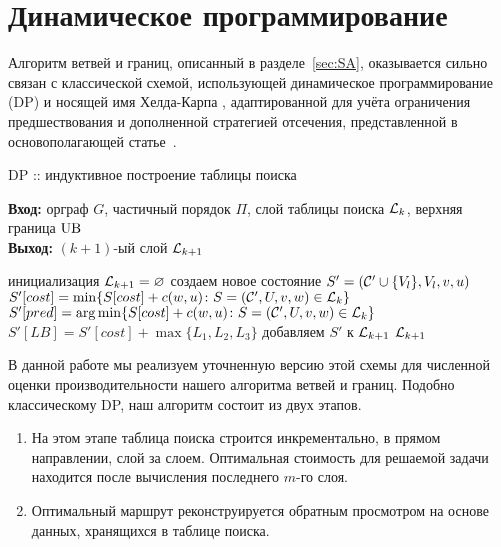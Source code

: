 \section{Динамическое программирование}\label{sec:DP}
Алгоритм ветвей и границ,
описанный в разделе~\ref{sec:SA},
оказывается сильно связан с классической схемой,
использующей динамическое программирование (DP)
и носящей имя Хелда-Карпа
\cite{HeldKarp1962},
адаптированной для учёта ограничения предшествования
и дополненной стратегией отсечения,
представленной в основополагающей статье~\cite{MorinMarsten1976}.

\begin{algorithm}[t]
\caption{DP ::  индуктивное построение таблицы поиска}\label{alg:A2}
\hspace*{\algorithmicindent}\textbf{Вход:} орграф $G$, частичный порядок $\Pi$, слой таблицы поиска $\mathcal{L}_k$, верхняя граница $\mathrm{UB}$\\
\hspace*{\algorithmicindent}\textbf{Выход:} $(k+1)$-ый слой $\mathcal{L}_{k+1}$
\begin{algorithmic}[1]
\STATE инициализация $\mathcal{L}_{k+1}=\varnothing$
      \STATE создаем новое состояние $S'=(\mathcal{C}'\cup\{V_l\}, V_l, v, u)$
      \STATE $S'[cost] = \min\{S[cost] + c(w,u)\colon S=(\mathcal{C}',U,v,w)\in\mathcal{L}_k\}$
      \STATE $S'[pred] = \arg\min\{S[cost] + c(w,u)\colon S=(\mathcal{C}',U,v,w)\in\mathcal{L}_k\}$
      \STATE $S'[LB] = S'[cost] + \max\{L_1,L_2,L_3\}$
        \STATE добавляем $S'$ к $\mathcal{L}_{k+1}$
      \ENDIF
    \ENDIF
    \ENDFOR
  \ENDFOR
\ENDFOR
\RETURN $\mathcal{L}_{k+1}$
\end{algorithmic}
\end{algorithm}

В данной работе мы реализуем уточненную версию этой схемы 
для численной оценки производительности нашего алгоритма ветвей и границ.
Подобно классическому DP,
наш алгоритм состоит из двух этапов.
\begin{enumerate}
  \item
  На этом этапе таблица поиска строится инкрементально,
  в прямом направлении, 
  слой за слоем.
  Оптимальная стоимость для решаемой задачи
  находится после вычисления последнего $m$-го слоя.   
  \item
  Оптимальный маршрут реконструируется обратным просмотром 
  на основе данных, 
  хранящихся в таблице поиска.
\end{enumerate}

